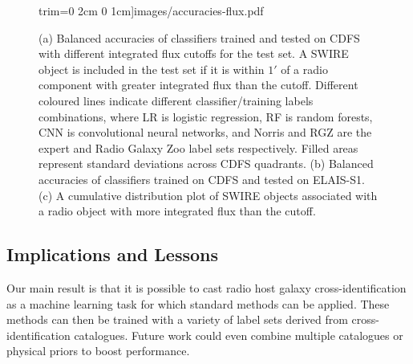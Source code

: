 \documentclass[fleqn,usenatbib,usedcolumn]{mnras}
\begin{document}
\begin{figure}
                     trim={0 2cm 0 1cm}]{images/accuracies-flux.pdf}
    \caption{(a) Balanced accuracies of classifiers trained and tested on CDFS
      with different integrated flux cutoffs for the test set. A SWIRE object
      is included in the test set if it is within $1'$ of a radio component
      with greater integrated flux than the cutoff. Different coloured lines
      indicate different classifier/training labels combinations, where LR is
      logistic regression, RF is random forests, CNN is convolutional neural
      networks, and Norris and RGZ are the expert and Radio Galaxy Zoo label
      sets respectively. Filled areas represent standard deviations across
      CDFS quadrants. (b) Balanced accuracies of classifiers trained on CDFS
      and tested on ELAIS-S1. (c) A cumulative distribution plot of SWIRE
      objects associated with a radio object with more integrated flux than
      the cutoff.}
    \label{fig:accuracies-flux}
  \end{figure}


  \subsection{Implications and Lessons}

    Our main result is that it is possible to cast radio host galaxy
    cross-identification as a machine learning task for which standard methods
    can be applied. These methods can then be trained with a variety of label
    sets derived from cross-identification catalogues. Future work could even
    combine multiple catalogues or physical priors to boost performance.
\end{document}
